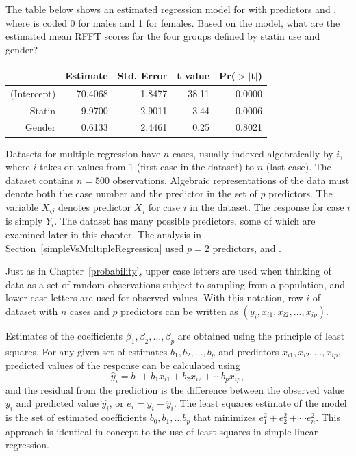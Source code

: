 \begin{exercise}
The table below shows an estimated regression model for  with predictors  and , where  is coded 0 for males and 1 for females.  Based on the model, what are the estimated mean RFFT scores for the four groups defined by statin use and gender? 
	\begin{table}[ht]
	\centering
	\begin{tabular}{rrrrr}
	  \hline
	 & Estimate & Std. Error & t value & Pr($>$$|$t$|$) \\ 
	  \hline
	(Intercept) & 70.4068 & 1.8477 & 38.11 & 0.0000 \\ 
	  Statin & -9.9700 & 2.9011 & -3.44 & 0.0006 \\ 
	  Gender & 0.6133 & 2.4461 & 0.25 & 0.8021 \\ 
	   \hline
	\end{tabular}
	\end{table}
\end{exercise}

Datasets for multiple regression have $n$ cases, usually indexed algebraically by $i$, where $i$ takes on values from 1 (first case in the dataset) to $n$ (last case).  The dataset  contains $n = 500$ observations.  Algebraic representations of the data must denote both the case number and the predictor in the set of $p$ predictors. The variable $X_{ij}$ denotes predictor $X_j$ for case $i$ in the dataset.  The response for case $i$ is simply $Y_i$. The dataset  has many possible predictors, some of which are examined later in this chapter.  The analysis in Section~\ref{simpleVsMultipleRegression} used $p=2$ predictors,  and .

Just as in Chapter~\ref{probability}, upper case letters are used when thinking of data as a set of random observations subject to sampling from a population, and lower case letters are used for observed values.  With this notation, row $i$ of dataset with $n$ cases and $p$ predictors can be written as $(y_i, x_{i1}, x_{i2}, \ldots, x_{ip})$.

Estimates of the coefficients $\beta_1,\beta_2,\ldots, \beta_p$ are obtained using the principle of least squares.  For any given set of estimates $b_1, b_2,\ldots,b_p$ and predictors $x_{i1},x_{i2},\ldots,x_{ip}$, predicted values of the response can be calculated using
\[
   \hat{y}_i = b_0 + b_1 x_{i1} + b_2 x_{i2} +\cdots b_p x_{ip},
\]
and the residual from the prediction is the difference between the observed value $y_i$ and predicted value $\hat{y_i}$, or $e_i = y_i - \hat{y}_i$.  The least squares estimate of the model is the set of estimated coefficients $b_0, b_1, \ldots b_p$ that minimizes $e_1^2 + e_2^2 + \cdots e_n^2$.  This approach is identical in concept to the use of least squares in simple linear regression.

